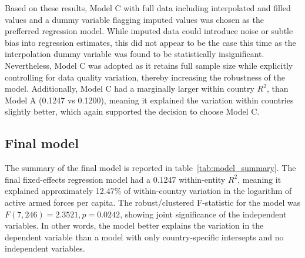 Based on these results, Model C with full data including interpolated and filled values and a dummy 
variable flagging imputed values was chosen
as the prefferred regression model. While imputed data could introduce noise or subtle bias
into regression estimates, this did not appear to be the case this time as the interpolation dummy 
variable was found to be statistically insignificant. 
Nevertheless, Model C was adopted as it retains full sample size while explicitly controlling 
for data quality variation, thereby increasing the robustness of the model.
Additionally, Model C had a marginally larger within country 
$R^2$, than Model A (0.1247 vs 0.1200), meaning it explained the variation within countries 
slightly better, which again supported the decision to choose Model C.

\subsection{Final model}

The summary of the final model is reported in table~\ref{tab:model_summary}.
The final fixed-effects regression model had a 0.1247 within-entity $R^2$, meaning it explained 
approximately 12.47\% of within-country variation in the logarithm of active armed forces per capita.
The robust/clustered F-statistic for the model was $F(7, 246)=2.3521, p=0.0242$, 
showing joint significance of the independent variables.
In other words, the model better explains the variation in the dependent variable than a model with 
only country-specific intersepts and no independent variables. 

\renewcommand{\arraystretch}{1.3}

